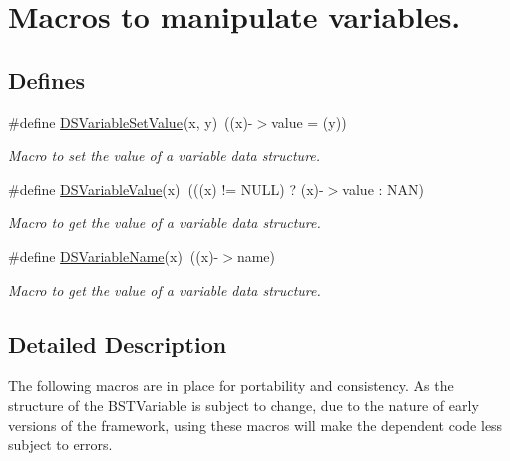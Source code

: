 \hypertarget{group___d_s___v_a_r_i_a_b_l_e___a_c_c_e_s_s_o_r_y}{
\section{Macros to manipulate variables.}
\label{group___d_s___v_a_r_i_a_b_l_e___a_c_c_e_s_s_o_r_y}
}
\subsection*{Defines}
\begin{DoxyCompactItemize}
\item 
\#define \hyperlink{group___d_s___v_a_r_i_a_b_l_e___a_c_c_e_s_s_o_r_y_ga218a0d1de0bb5ea62d7e5aa22fe50793}{DSVariableSetValue}(x, y)~((x)-\/$>$value = (y))
\begin{DoxyCompactList}\small\item\em Macro to set the value of a variable data structure. \item\end{DoxyCompactList}\item 
\#define \hyperlink{group___d_s___v_a_r_i_a_b_l_e___a_c_c_e_s_s_o_r_y_ga837d0718b28591df6f518eb50d98082a}{DSVariableValue}(x)~(((x) != NULL) ? (x)-\/$>$value : NAN)
\begin{DoxyCompactList}\small\item\em Macro to get the value of a variable data structure. \item\end{DoxyCompactList}\item 
\#define \hyperlink{group___d_s___v_a_r_i_a_b_l_e___a_c_c_e_s_s_o_r_y_ga64afbf5e8e378ef611c25084211152c4}{DSVariableName}(x)~((x)-\/$>$name)
\begin{DoxyCompactList}\small\item\em Macro to get the value of a variable data structure. \item\end{DoxyCompactList}\end{DoxyCompactItemize}


\subsection{Detailed Description}
The following macros are in place for portability and consistency. As the structure of the BSTVariable is subject to change, due to the nature of early versions of the framework, using these macros will make the dependent code less subject to errors. 

